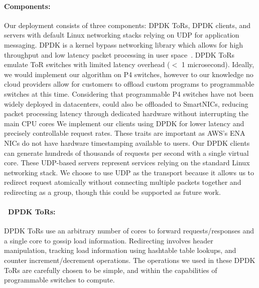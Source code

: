 \paragraph{Components:} Our deployment consists of three components: DPDK ToRs,
DPDK clients, and servers with default Linux networking stacks relying on UDP
for application messaging. DPDK is a kernel bypass networking library which
allows for high throughput and low latency packet processing in user
space~\cite{dpdk}. DPDK ToRs emulate ToR switches with limited latency overhead
($<$ 1 microsecond).  Ideally, we would implement our algorithm on P4 switches,
however to our knowledge no cloud providers allow for customers to offload
custom programs to programmable switches at this time.  
%
Considering that programmable P4 switches have not been widely deployed in datacenters, \daronpon could also be offloaded to SmartNICs, reducing packet processing latency through dedicated hardware without interrupting the main CPU cores
%
%
We implement our clients using DPDK for lower latency and precisely controllable request rates.
These traits are important as AWS's ENA NICs do not have hardware timestamping
available to users.  Our DPDK clients can generate hundreds of thousands of
requests per second with a single virtual core. These UDP-based servers
represent services relying on the standard Linux networking stack. We choose to
use UDP as the transport because it allows us to redirect request atomically
without connecting multiple packets together and redirecting as a group, though
this could be supported as future work.

\paragraph{\daronpon\ DPDK ToRs:} DPDK ToRs use an arbitrary number
of cores to forward requests/responses and a single core to gossip
load information. Redirecting involves header manipulation, tracking
load information using hashtable table lookups, and counter
increment/decrement operations. The operations we used in these DPDK
ToRs are carefully chosen to be simple, and within the capabilities of
programmable switches to compute.

